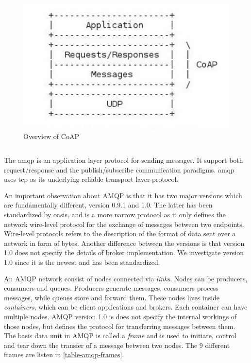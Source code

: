 \begin{figure}[h]
\centering
\includegraphics[scale=0.6]{images/coap.pdf}
\caption{Overview of CoAP}
\end{figure}


\subsection{}

The \gls{amqp} is an application layer protocol for sending messages.
It support both request/response and the publish/subscribe communication
paradigms. \gls{amqp} uses \gls{tcp} as its underlying reliable transport layer
protocol.

 An important observation about AMQP is that it has two major versions which are
 fundamentally different, version 0.9.1 and 1.0. The latter has been
 standardized by \gls{oasis}\cite{oasis-amqp}, and is a  more narrow protocol as
 it only defines the network wire-level protocol for the exchange of messages
 between two endpoints. Wire-level protocols refers to the description of the
 format of data sent over a network in form of bytes. Another difference between
 the versions is that version 1.0 does not specify the details of broker
 implementation. We investigate version 1.0 since it is the newest and has been
 standardized.

An AMQP network consist of nodes connected via \textit{links}. Nodes can be
producers, consumers and queues. Producers generate messages, consumers process
messages, while queues store and forward them. These nodes lives inside
\textit{containers}, which can be client applications and brokers. Each
container can have multiple nodes. AMQP version 1.0 is does not specify the
internal workings of those nodes, but defines the protocol for transferring
messages between them. The basis data unit in AMQP is called a \textit{frame}
and is used to initiate, control and tear down the transfer of a message between
two nodes. The 9 different frames are listen in \cref{table-amqp-frames}.

